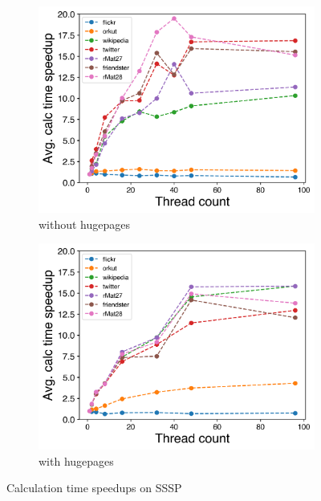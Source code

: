 \documentclass{meetings}
\begin{document}
\begin{figure}
	\hfil
	\begin{subfigure}{0.48\columnwidth}
		\includegraphics[width=\linewidth]{../../plots/singleNodeSSSPGaloisThreads.png}
		\caption{without hugepages}
		\label{fig:galoisSpeedupSSSP_noHP}
	\end{subfigure}
	\begin{subfigure}{0.48\columnwidth}
		\includegraphics[width=\linewidth]{../../plots/singleNodeSSSPGaloisHPThreads.png}
		\caption{with hugepages}
		\label{fig:galoisSpeedupSSSP_HP}
	\end{subfigure}
	\hfil
	\caption{Calculation time speedups on SSSP}
	\label{fig:galoisSpeedupSSSP}
\end{figure}
\end{document}
